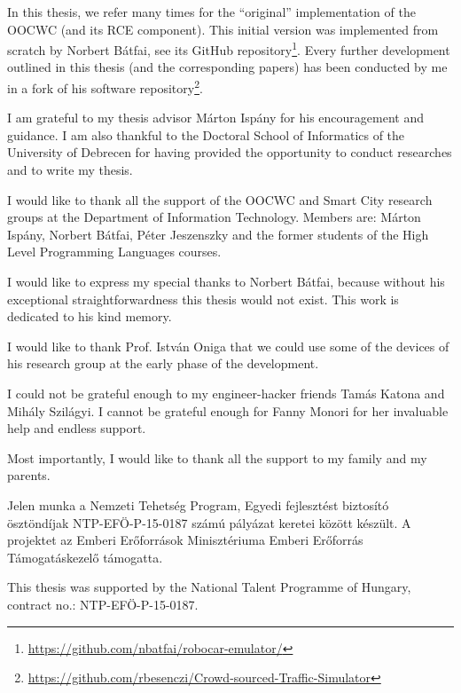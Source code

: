 \documentclass[b5paper,12pt]{report}
\theoremstyle{definition}
\begin{document}
\begin{singlespace}
\footnotesize

\noindent
In this thesis, we refer many times for the \enquote{original} implementation of the OOCWC (and its RCE component). This initial version was implemented from scratch by Norbert Bátfai, see its GitHub repository\footnote{\url{https://github.com/nbatfai/robocar-emulator/}}. Every further development outlined in this thesis (and the corresponding papers) has been conducted by me in a fork of his software repository\footnote{\url{https://github.com/rbesenczi/Crowd-sourced-Traffic-Simulator}}.

\noindent
I am grateful to my thesis advisor Márton Ispány for his encouragement and guidance. I am also thankful to the Doctoral School of Informatics of the University of Debrecen for having provided the opportunity to conduct researches and to write my thesis.

\noindent
I would like to thank all the support of the OOCWC and Smart City research groups at the Department of Information Technology. Members are: Márton Ispány, Norbert Bátfai, Péter Jeszenszky and the former students of the High Level Programming Languages courses.

\noindent
I would like to express my special thanks to Norbert Bátfai, because without his exceptional straightforwardness this thesis would not exist. This work is dedicated to his kind memory.

\noindent
I would like to thank Prof. István Oniga that we could use some of the devices of his research group at the early phase of the development.

\noindent
I could not be grateful enough to my engineer-hacker friends Tamás Katona and Mihály Szilágyi. I cannot be grateful enough for Fanny Monori for her invaluable help and endless support.

\noindent
Most importantly, I would like to thank all the support to my family and my parents.

\noindent
Jelen munka a Nemzeti Tehetség Program, Egyedi fejlesztést biztosító ösztöndíjak NTP-EFÖ-P-15-0187 számú pályázat keretei között készült. A projektet az Emberi Erőforrások Minisztériuma Emberi Erőforrás Támogatáskezelő támogatta.

\noindent
This thesis was supported by the National Talent Programme of Hungary, contract no.: NTP-EFÖ-P-15-0187.


\end{singlespace}
\end{document}
